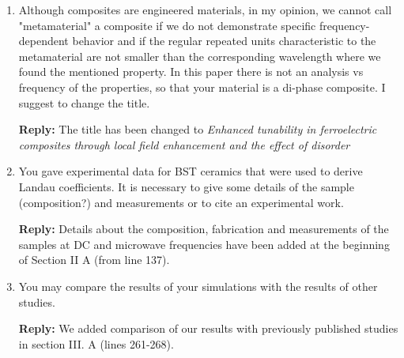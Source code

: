 \documentclass[%
 aip,
 amsmath,amssymb,
 reprint,%
]{revtex4-1}
\newcommand{\rep}[1]{\textcolor{reply}{{\bfseries Reply:} #1}}
\begin{document}
  \begin{enumerate}
  \item Although composites are engineered materials, in my opinion, we cannot call "metamaterial" a
   composite if we do not demonstrate specific frequency-dependent behavior and if the regular repeated
    units characteristic to the metamaterial are not smaller than the corresponding wavelength where we
     found the mentioned property. In this paper there is not an analysis vs frequency of the properties,
      so that your material is a di-phase composite. I suggest to change the title.

\rep{The title has been changed to \textit{Enhanced tunability in ferroelectric composites through local field
enhancement and the effect of disorder}}

  \item You gave experimental data for BST ceramics that were used to derive Landau coefficients. It is
   necessary to give some details of the sample (composition?) and measurements or to cite an experimental
    work.

    \rep{Details about the composition, fabrication and measurements of the samples at DC and microwave frequencies have been added at the beginning of Section II A  (from line 137).}



  \item You may compare the results of your simulations with the results of other studies.

  \rep{We added comparison of our results with previously published studies in section III. A (lines 261-268).}


\end{enumerate}
\end{document}
